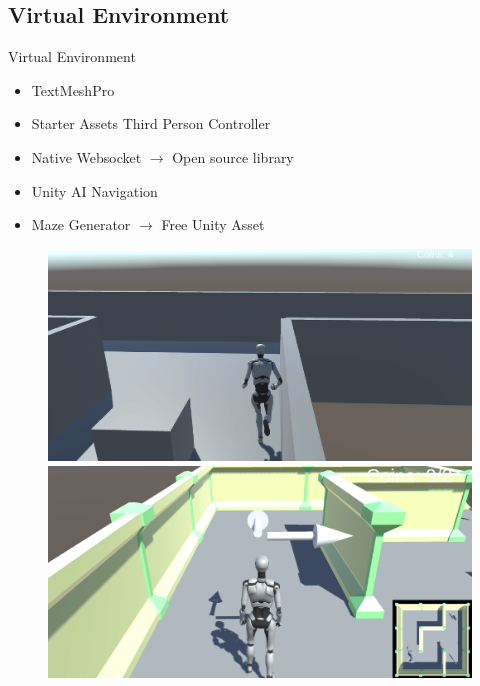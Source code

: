 \subsection*{Virtual Environment}
\begin{frame}{Virtual Environment}
    \begin{minipage}[c]{.5\textwidth}
        \begin{itemize}
            \item TextMeshPro
            \item Starter Assets \textemdash{} Third Person Controller
            \item Native Websocket $\xrightarrow{}$ Open source library
            \item Unity AI Navigation
            \item Maze Generator $\xrightarrow{}$ Free Unity Asset
        \end{itemize}
        \begin{figure}[!htbp]
            \centering
            \includegraphics[width=.49\textwidth]{figures/Methodology/infinite_runner}
            \includegraphics[width=.49\textwidth]{figures/Methodology/maze}
        \end{figure}
    \end{minipage}
    \begin{minipage}[c]{.49\textwidth}
        \begin{figure}[!htbp]
            \centering
\end{figure}
\end{minipage}
\end{frame}
